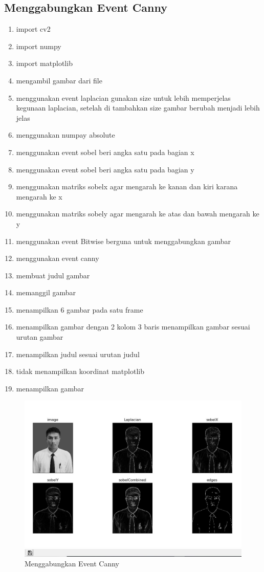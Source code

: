 \subsection{Menggabungkan Event Canny}

\begin{enumerate}
	\item import cv2
	\item import numpy
	\item import matplotlib
	\item mengambil gambar dari file
	\item menggunakan event laplacian gunakan size untuk lebih memperjelas kegunaan laplacian, setelah di tambahkan size gambar berubah menjadi lebih jelas
	\item menggunakan numpay absolute
	\item menggunakan event sobel beri angka satu pada bagian x
	\item menggunakan event sobel beri angka satu pada bagian y
	\item menggunakan matriks sobelx agar mengarah ke kanan dan kiri karana mengarah ke x
	\item menggunakan matriks sobely agar mengarah ke atas dan bawah mengarah ke y
	\item menggunakan event Bitwise berguna untuk menggabungkan gambar
	\item menggunakan event canny
	\item membuat judul gambar
	\item memanggil gambar
	\item menampilkan 6 gambar pada satu frame
	\item menampilkan gambar dengan 2 kolom 3 baris menampilkan gambar sesuai urutan gambar
	\item menampilkan judul sesuai urutan judul
	\item tidak menampilkan koordinat matplotlib
	\item menampilkan gambar
\end{enumerate}

\begin{figure}[ht]
\centering
\includegraphics[scale=0.45]{figures/2,70.jpg}
\caption{Menggabungkan Event Canny}
\label{contoh}
\end{figure}